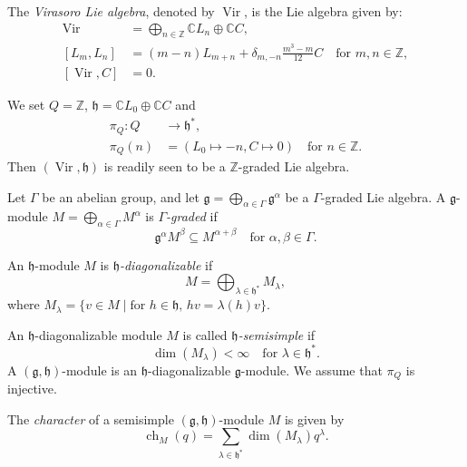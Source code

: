 \documentclass[a4paper, 12pt, reqno]{amsart}
\DeclareMathOperator{\Vir}{Vir}
\DeclareMathOperator{\ch}{ch}
\begin{document}
The \emph{Virasoro Lie algebra}, denoted by $\Vir$, is the Lie algebra given by:
  \begin{align*}
    \Vir &= \bigoplus_{n \in \mathbb{Z}}\mathbb{C}L_n \oplus \mathbb{C}C, \\
    [L_m, L_n] &= (m - n)L_{m + n} + \delta_{m, -n}\frac{m^3 - m}{12}C \quad \text{for $m, n \in \mathbb{Z}$}, \\
    [\Vir, C] &= 0.
  \end{align*}

  We set $Q = \mathbb{Z}$, $\mathfrak{h} = \mathbb{C}L_0 \oplus \mathbb{C}C$ and
  \begin{align*}
    \pi_Q: Q &\to \mathfrak{h}^*, \\
    \pi_Q(n) &= (L_0 \mapsto -n, C \mapsto 0) \quad \text{for $n \in \mathbb{Z}$}.
  \end{align*}
  Then $(\Vir, \mathfrak{h})$ is readily seen to be a $\mathbb{Z}$-graded Lie algebra.

Let $\Gamma$ be an abelian group, and let $\mathfrak{g} = \bigoplus_{\alpha \in \Gamma}\mathfrak{g}^{\alpha}$ be a $\Gamma$-graded Lie algebra.
  A $\mathfrak{g}$-module $M = \bigoplus_{\alpha \in \Gamma}M^{\alpha}$ is \emph{$\Gamma$-graded} if
  \begin{equation*}
    \mathfrak{g}^{\alpha}M^{\beta} \subseteq M^{\alpha + \beta} \quad \text{for $\alpha, \beta \in \Gamma$}.
  \end{equation*}

An $\mathfrak{h}$-module $M$ is \emph{$\mathfrak{h}$-diagonalizable} if
  \begin{equation*}
    M = \bigoplus_{\lambda \in \mathfrak{h}^*}M_{\lambda},
  \end{equation*}
  where $M_{\lambda} = \{v \in M \mid \text{for $h \in \mathfrak{h}$, $hv = \lambda(h)v$}\}$.
  
An $\mathfrak{h}$-diagonalizable module $M$ is called \emph{$\mathfrak{h}$-semisimple} if
  \begin{equation*}
    \dim(M_{\lambda}) < \infty \quad \text{for $\lambda \in \mathfrak{h}^*$}.
  \end{equation*}
  A $(\mathfrak{g}, \mathfrak{h})$-module is an $\mathfrak{h}$-diagonalizable $\mathfrak{g}$-module.
  We assume that $\pi_Q$ is injective.

  The \emph{character} of a semisimple $(\mathfrak{g}, \mathfrak{h})$-module $M$ is given by
  \begin{equation*}
    \ch_M(q) = \sum_{\lambda \in \mathfrak{h}^*}\dim(M_{\lambda})q^{\lambda}.
  \end{equation*}
\end{document}
